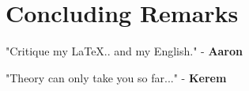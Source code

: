 \setcounter{chapter}{11}
\chapter{Concluding Remarks}
\large
"Critique my \LaTeX.. and my English." - \textbf{Aaron}

"Theory can only take you so far..." - \textbf{Kerem}
